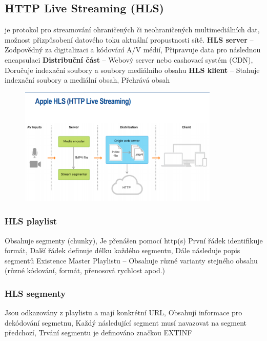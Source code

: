 \subsection{HTTP Live Streaming (HLS) }
je protokol pro streamování ohraničených či neohraničených multimediálních dat, možnost přizpůsobení datového toku aktuální propustnosti sítě.\newline
\textbf{HLS server} -- Zodpovědný za digitalizaci a kódování A/V médií, Připravuje data pro následnou encapsulaci \newline
\textbf{Distribuční část} -- Webový server nebo cashovací systém (CDN), Doručuje indexační soubory a soubory mediálního obsahu \newline
\textbf{HLS klient} -- Stahuje indexační soubory a mediální obsah, Přehrává obsah

\begin{figure} [h]
     \centering
     \includegraphics[width=0.85\textwidth]{images/hls.PNG}
\end{figure}

\subsubsection{HLS playlist}
Obsahuje segmenty (chunky), Je přenášen pomocí http(s) \newline
První řádek identifikuje formát, Další řádek definuje délku každého segmentu, Dále následuje popis segmentů\newline
Existence Master Playlistu -- Obsahuje různé varianty stejného obsahu (různé kódování, formát, přenosová
rychlost apod.)

\subsubsection{HLS segmenty}
Jsou odkazovány z playlistu a mají konkrétní URL, Obsahují informace pro dekódování segmetnu, Každý následující segment musí navazovat na segment předchozí, Trvání segmentu je definováno značkou EXTINF


